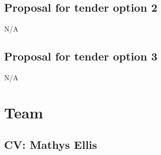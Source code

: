 \documentclass[12pt]{article}
\begin{document}
	\subsection{Proposal for tender option 2}
	N/A
	
	\subsection{Proposal for tender option 3}
	N/A	
	\newpage
	\section{Team}
	
	\subsection{CV: Mathys Ellis}
	\colorbox{green}{\makebox[475px]{}}
	
	\begin{figure}[ht!]
		\centering
		\fboxsep=0mm%
		\fboxrule=4pt%
	\end{figure}
		
\end{document}
